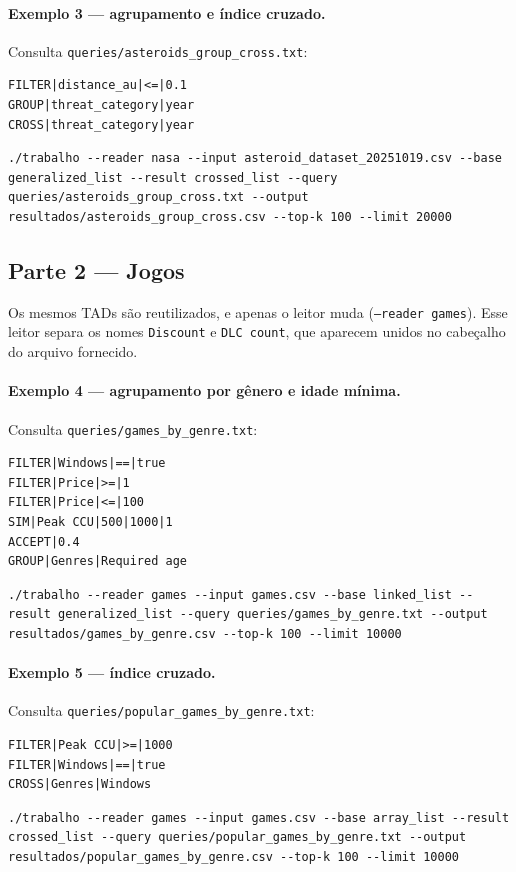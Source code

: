 \documentclass[11pt,a4paper]{article}
\begin{document}
\paragraph{Exemplo 3 --- agrupamento e índice cruzado.} Consulta \texttt{queries/\allowbreak{}asteroids\_\allowbreak{}group\_\allowbreak{}cross.txt}:
\begin{lstlisting}
FILTER|distance_au|<=|0.1
GROUP|threat_category|year
CROSS|threat_category|year
\end{lstlisting}
\begin{lstlisting}
./trabalho --reader nasa --input asteroid_dataset_20251019.csv --base generalized_list --result crossed_list --query queries/asteroids_group_cross.txt --output resultados/asteroids_group_cross.csv --top-k 100 --limit 20000
\end{lstlisting}

\subsection{Parte 2 --- Jogos}

Os mesmos TADs são reutilizados, e apenas o leitor muda (\texttt{--reader games}). Esse leitor separa os nomes \texttt{Discount} e \texttt{DLC count}, que aparecem unidos no cabeçalho do arquivo fornecido.

\paragraph{Exemplo 4 --- agrupamento por gênero e idade mínima.} Consulta \texttt{queries/\allowbreak{}games\_\allowbreak{}by\_\allowbreak{}genre.txt}:
\begin{lstlisting}
FILTER|Windows|==|true
FILTER|Price|>=|1
FILTER|Price|<=|100
SIM|Peak CCU|500|1000|1
ACCEPT|0.4
GROUP|Genres|Required age
\end{lstlisting}
\begin{lstlisting}
./trabalho --reader games --input games.csv --base linked_list --result generalized_list --query queries/games_by_genre.txt --output resultados/games_by_genre.csv --top-k 100 --limit 10000
\end{lstlisting}

\paragraph{Exemplo 5 --- índice cruzado.} Consulta \texttt{queries/\allowbreak{}popular\_\allowbreak{}games\_\allowbreak{}by\_\allowbreak{}genre.txt}:
\begin{lstlisting}
FILTER|Peak CCU|>=|1000
FILTER|Windows|==|true
CROSS|Genres|Windows
\end{lstlisting}
\begin{lstlisting}
./trabalho --reader games --input games.csv --base array_list --result crossed_list --query queries/popular_games_by_genre.txt --output resultados/popular_games_by_genre.csv --top-k 100 --limit 10000
\end{lstlisting}
\end{document}
